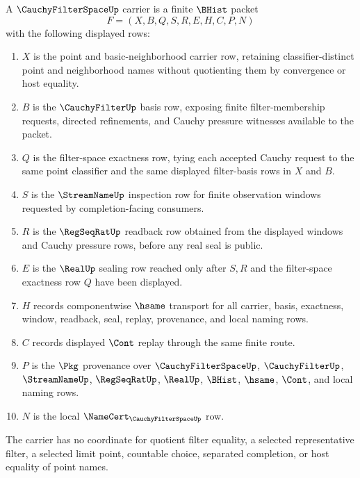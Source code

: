 \begin{definition}
\label{def:cauchy-filter-space-carrier}
A $\CauchyFilterSpaceUp$ carrier is a finite $\BHist$ packet
$$
F=(X,B,Q,S,R,E,H,C,P,N)
$$
with the following displayed rows:
\begin{enumerate}
\item $X$ is the point and basic-neighborhood carrier row, retaining classifier-distinct point and neighborhood names without quotienting them by convergence or host equality.
\item $B$ is the $\CauchyFilterUp$ basis row, exposing finite filter-membership requests, directed refinements, and Cauchy pressure witnesses available to the packet.
\item $Q$ is the filter-space exactness row, tying each accepted Cauchy request to the same point classifier and the same displayed filter-basis rows in $X$ and $B$.
\item $S$ is the $\StreamNameUp$ inspection row for finite observation windows requested by completion-facing consumers.
\item $R$ is the $\RegSeqRatUp$ readback row obtained from the displayed windows and Cauchy pressure rows, before any real seal is public.
\item $E$ is the $\RealUp$ sealing row reached only after $S,R$ and the filter-space exactness row $Q$ have been displayed.
\item $H$ records componentwise $\hsame$ transport for all carrier, basis, exactness, window, readback, seal, replay, provenance, and local naming rows.
\item $C$ records displayed $\Cont$ replay through the same finite route.
\item $P$ is the $\Pkg$ provenance over $\CauchyFilterSpaceUp$, $\CauchyFilterUp$, $\StreamNameUp$, $\RegSeqRatUp$, $\RealUp$, $\BHist$, $\hsame$, $\Cont$, and local naming rows.
\item $N$ is the local $\NameCert_{\CauchyFilterSpaceUp}$ row.
\end{enumerate}
The carrier has no coordinate for quotient filter equality, a selected representative filter, a selected limit point, countable choice, separated completion, or host equality of point names.
\end{definition}

